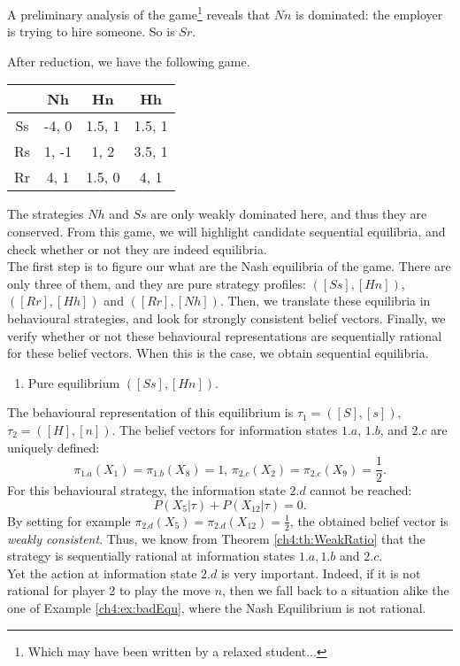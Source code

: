 \begin{example}
A preliminary analysis of the game\footnote{Which may have been written by a relaxed student...} reveals that $Nn$ is dominated: the employer is trying to hire someone. So is $Sr$.


After reduction, we have the following game.
\begin{center}
\begin{tabular}{c|ccc}
  & Nh  & Hn & Hh \\
\hline
Ss  & -4, 0 & 1.5, 1 & 1.5, 1 \\
Rs  &  1, -1 & 1, 2& 3.5, 1 \\
Rr  &  4, 1  & 1.5, 0 & 4, 1 \\
\end{tabular}
\end{center}
 The strategies $Nh$ and $Ss$ are only weakly dominated here, and thus they are conserved. From this game, we will highlight candidate sequential equilibria, and check whether or not they are indeed equilibria.\\
  The first step is to figure our what are the Nash equilibria of the game. There are only three of them, and they are pure strategy profiles: $([Ss], [Hn])$,  $([Rr], [Hh])$ and $([Rr] , [Nh])$.
Then, we translate these equilibria in behavioural strategies, and look for strongly consistent belief vectors. Finally, we verify whether or not these behavioural representations are sequentially rational for these belief vectors. When this is the case, we obtain sequential equilibria.
\begin{enumerate}
\item Pure equilibrium $([Ss], [Hn])$.
\end{enumerate}
The behavioural representation of this equilibrium is $\tau_1 = ([S],[s])$, $\tau_2 = ([H],[n])$.
The belief vectors for information states $1.a$, $1.b$, and $2.c$ are uniquely defined:
$$
\pi_{1.a}(X_1) = \pi_{1.b}(X_8) =1, \,  \pi_{2.c}(X_2) = \pi_{2.c}(X_9) = \frac{1}{2}.
$$
For this behavioural strategy, the information state $2.d$ cannot be reached:
$$P(X_5 | \tau) + P(X_{12} | \tau) = 0. $$
By setting for example $\pi_{2.d}(X_5) = \pi_{2.d}(X_{12}) = \frac{1}{2}$, the obtained belief vector is \emph{weakly consistent}. Thus, we know from Theorem \ref{ch4:th:WeakRatio} that the strategy is sequentially rational at information states $1.a, 1.b$ and $2.c$.\\
Yet the action at information state $2.d$ is very important. Indeed, if it is not rational for player 2 to play the move $n$, then we fall back to a situation alike the one of Example \ref{ch4:ex:badEqu}, where the Nash Equilibrium is not rational.\\

\end{example}
